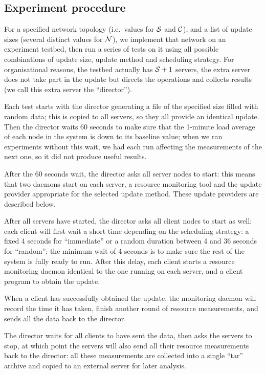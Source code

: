 \documentclass[a4paper,12pt]{article}
\begin{document}
\subsection{Experiment procedure}
For a specified network topology (i.e.\ values for ${\cal S}$ and ${\cal C}$),
and a list of update sizes (several distinct values for ${\cal N}$),
we implement that network on an experiment testbed, then run a series of
tests on it using all possible combinations of update size, update method
and scheduling strategy.  For organisational reasons, the testbed actually
has ${\cal S} + 1$ servers, the extra server does not take part in the
update but directs the operations and collects results (we call this extra
server the ``director'').

Each test starts with the director generating a file of the specified size
filled with random data; this is copied to all servers, so they all provide
an identical update.  Then the director waits 60 seconds to make sure that
the 1-minute load average of each node in the system is down to its
baseline value; when we ran experiments without this wait, we had each
run affecting the measurements of the next one, so it did not produce
useful results.

After the 60 seconds wait, the director asks all server nodes to start:
this means that two daemons start on each server, a resource monitoring
tool and the update provider appropriate for the selected update method.
These update providers are described below.

After all servers have started, the director asks all client nodes to
start as well: each client will first wait a short time depending on
the scheduling strategy: a fixed 4 seconds for ``immediate'' or a
random duration between 4 and 36 seconds for ``random''; the minimum
wait of 4 seconds is to make sure the rest of the system is fully
ready to run. After this delay, each client starts a resource monitoring
daemon identical to the one running on each server, and a client
program to obtain the update.

When a client has successfully obtained the update, the monitoring
daemon will record the time it has taken, finish another round of
resource measurements, and sends all the data back to the director.

The director waits for all clients to have sent the data, then asks
the servers to stop, at which point the servers will also send all
their resource measurements back to the director: all these measurements
are collected into a single ``tar'' archive and copied to an external
server for later analysis.
\end{document}
